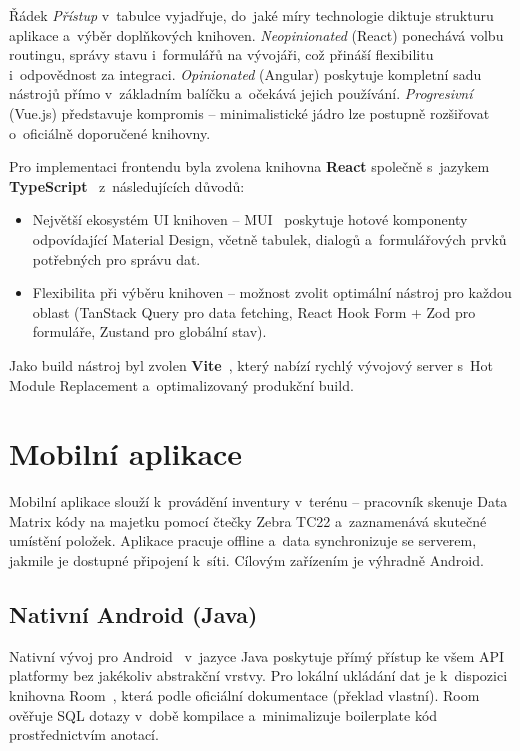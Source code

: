 Řádek \emph{Přístup} v~tabulce vyjadřuje, do~jaké míry technologie diktuje strukturu aplikace a~výběr doplňkových knihoven. \emph{Neopinionated} (React) ponechává volbu routingu, správy stavu i~formulářů na vývojáři, což přináší flexibilitu i~odpovědnost za integraci. \emph{Opinionated} (Angular) poskytuje kompletní sadu nástrojů přímo v~základním balíčku a~očekává jejich používání. \emph{Progresivní} (Vue.js) představuje kompromis -- minimalistické jádro lze postupně rozšiřovat o~oficiálně doporučené knihovny.

Pro implementaci frontendu byla zvolena knihovna \textbf{React} společně s~jazykem
\textbf{TypeScript}~\cite{typescript} z~následujících důvodů:
\begin{itemize}
	\item Největší ekosystém UI knihoven -- MUI~\cite{mui} poskytuje hotové komponenty odpovídající Material Design, včetně tabulek, dialogů a~formulářových prvků potřebných pro správu dat.
	\item Flexibilita při výběru knihoven -- možnost zvolit optimální nástroj pro každou oblast (TanStack Query pro data fetching, React Hook Form + Zod pro formuláře, Zustand pro globální stav).
\end{itemize}

Jako build nástroj byl zvolen \textbf{Vite}~\cite{vite}, který nabízí rychlý vývojový server s~Hot Module Replacement a~optimalizovaný produkční build.


\section{Mobilní aplikace}

Mobilní aplikace slouží k~provádění inventury v~terénu -- pracovník skenuje Data Matrix kódy na majetku pomocí čtečky Zebra TC22 a~zaznamenává skutečné umístění položek. Aplikace pracuje offline a~data synchronizuje se serverem, jakmile je dostupné připojení k~síti. Cílovým zařízením je výhradně Android.

\subsection{Nativní Android (Java)}

Nativní vývoj pro Android~\cite{android} v~jazyce Java poskytuje přímý přístup ke všem API platformy bez jakékoliv abstrakční vrstvy. Pro lokální ukládání dat je k~dispozici knihovna Room~\cite{androidroom}, která podle oficiální dokumentace  (překlad vlastní). Room ověřuje SQL dotazy v~době kompilace a~minimalizuje boilerplate kód prostřednictvím anotací.

